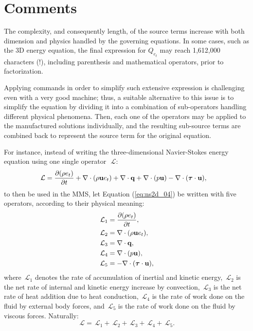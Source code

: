 \documentclass[10pt]{article}
\newcommand{\Diff}[2] {\dfrac{\partial( #1)}{\partial #2}}
\newcommand{\bv}[1]{\ensuremath{\mbox{\boldmath$ #1 $}}}
\newcommand{\Lo}{\,\mathcal{L}}
\begin{document}
\section{Comments}
The complexity, and consequently length, of the source terms increase with both dimension and physics handled by the governing equations. In some cases, such as the 3D energy equation, the final expression for $Q_{e_t}$ may reach 1,612,000 characters (!), including parenthesis and mathematical operators, prior to factorization.

Applying commands in order to simplify such extensive expression is challenging even with a very good machine; thus, a suitable alternative to this issue is to simplify the equation by dividing it into a combination of sub-operators handling different physical phenomena. Then, each one of the operators may be applied to the manufactured solutions individually, and the resulting sub-source terms are combined back to represent the source term for the original equation.



For instance, instead of writing the three-dimensional Navier-Stokes energy equation using one single operator~$\Lo$:
\begin{equation}
 \label{eq:ns2d_04}
\begin{split}
\Lo= \Diff{\rho e_t}{t}&+\nabla \cdot (\rho\mathbf{u}e_t) +\nabla\cdot \mathbf{q} +  \nabla\cdot(p  \mathbf{u})  - \nabla \cdot (\bv{\tau} \cdot \mathbf{u}),
\end{split}
\end{equation}
to then be used in the MMS, let Equation (\ref{eq:ns2d_04}) be written with five operators, according to their physical meaning:
\begin{equation}
 \begin{split}
  \Lo_1&=\Diff{\rho e_t}{t} ,\\
  \Lo_2&=\nabla \cdot (\rho\mathbf{u}e_t),\\
  \Lo_3&=\nabla\cdot \mathbf{q},\\
  \Lo_4&= \nabla\cdot(p  \mathbf{u}),\\
  \Lo_5&=- \nabla \cdot (\bv{\tau} \cdot \mathbf{u}),
 \end{split}
\end{equation}
where $\Lo_1$ denotes the rate of accumulation of inertial and kinetic energy, $\Lo_2$ is the net rate of internal and kinetic energy increase by convection, $\Lo_3$ is the net rate of heat addition due to heat conduction, $\Lo_4$ is the rate of work done on the fluid by external body forces, and $\Lo_5$ is the rate of work done on the fluid by viscous forces. Naturally:
$$\Lo=\Lo_1+\Lo_2+\Lo_3+\Lo_4+\Lo_5.$$
\end{document}

